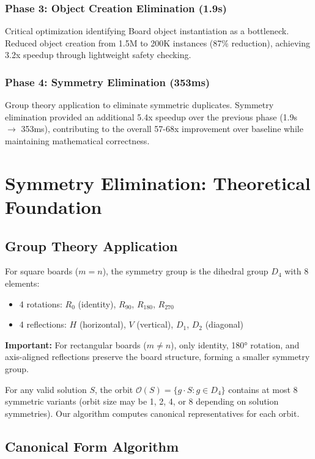 \documentclass[12pt,a4paper]{article}
\theoremstyle{definition}
\begin{document}
\subsubsection{Phase 3: Object Creation Elimination (1.9s)}
Critical optimization identifying Board object instantiation as a bottleneck. Reduced object creation from 1.5M to 200K instances (87\% reduction), achieving 3.2x speedup through lightweight safety checking.

\subsubsection{Phase 4: Symmetry Elimination (353ms)}
Group theory application to eliminate symmetric duplicates. Symmetry elimination provided an additional 5.4x speedup over the previous phase (1.9s $\rightarrow$ 353ms), contributing to the overall 57-68x improvement over baseline while maintaining mathematical correctness.

\section{Symmetry Elimination: Theoretical Foundation}

\subsection{Group Theory Application}

For square boards ($m = n$), the symmetry group is the dihedral group $D_4$ with 8 elements:
\begin{itemize}
\item 4 rotations: $R_0$ (identity), $R_{90}$, $R_{180}$, $R_{270}$
\item 4 reflections: $H$ (horizontal), $V$ (vertical), $D_1$, $D_2$ (diagonal)
\end{itemize}

\textbf{Important:} For rectangular boards ($m \neq n$), only identity, 180° rotation, and axis-aligned reflections preserve the board structure, forming a smaller symmetry group.

For any valid solution $S$, the orbit $\mathcal{O}(S) = \{g \cdot S : g \in D_4\}$ contains at most 8 symmetric variants (orbit size may be 1, 2, 4, or 8 depending on solution symmetries). Our algorithm computes canonical representatives for each orbit.

\subsection{Canonical Form Algorithm}
\end{document}
